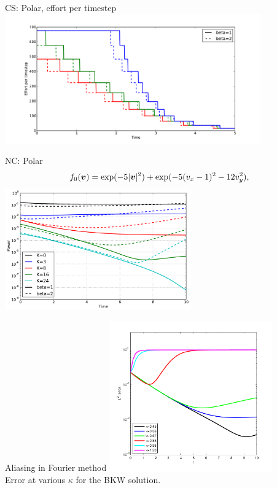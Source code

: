 \documentclass[hyperref={bookmarksopen, colorlinks, linkcolor=blue, urlcolor=green, citecolor=red}, color={usenames,dvipsnames}]{beamer}
\begin{document}
\begin{frame}{CS: Polar, effort per timestep}
\centering
\includegraphics[width=11cm]{../figs/polboltz/adapt}
\end{frame}

\begin{frame}{NC: Polar}
\[
    f_0({\bm v}) = \exp(-5|{\bm v}|^2) + \exp(-5(v_x-1)^2-12v_y^2),
\]
\centering
\includegraphics[width=8cm]{../figs/polboltz/power-comp2}
\end{frame}

\begin{frame}{Aliasing in Fourier method}
\centering
\includegraphics[width=7cm]{../figs/hcboltz/testr} \\
Error at various $\kappa$ for the BKW solution.
\end{frame}
\end{document}
